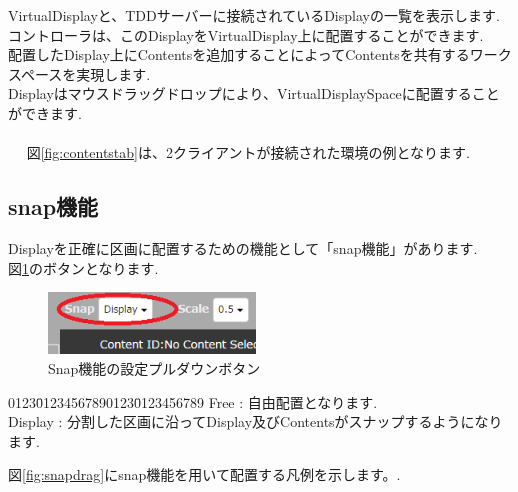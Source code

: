 \documentclass[a4paper,10pt,oneside]{jsbook}
\begin{document}
VirtualDisplayと、TDDサーバーに接続されているDisplayの一覧を表示します.\\
コントローラは、このDisplayをVirtualDisplay上に配置することができます.\\

配置したDisplay上にContentsを追加することによってContentsを共有するワークスペースを実現します.\\
Displayはマウスドラッグドロップにより、VirtualDisplaySpaceに配置することができます.\\
\\　
図\ref{fig:contentstab}は、2クライアントが接続された環境の例となります.


\clearpage 



\subsection{snap機能}
Displayを正確に区画に配置するための機能として「snap機能」があります.\\
図\ref{fig:snapdisp}のボタンとなります.\\

\begin{figure}[htbp]
	\begin{center}
		\includegraphics[width=5.5cm]{image/MIGIUE_Disp.PNG}
	\end{center}
	\caption{Snap機能の設定プルダウンボタン}
	\label{fig:snapdisp}
\end{figure}


\begin{tabbing}
0123\=01234567890123\=0123456789\kill
\>Free    \> : 自由配置となります.\\
\>Display \> : 分割した区画に沿ってDisplay及びContentsがスナップするようになります.
\end{tabbing}

図\ref{fig:snapdrag}にsnap機能を用いて配置する凡例を示します。.\\
\end{document}
